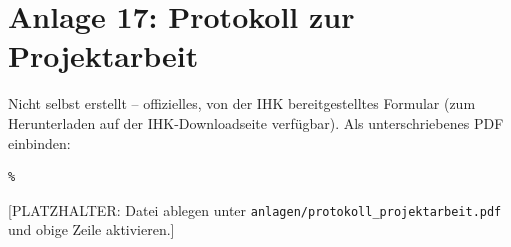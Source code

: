 \section*{Anlage 17: Protokoll zur Projektarbeit}
\label{anh:protokoll_projektarbeit}
Nicht selbst erstellt -- offizielles, von der IHK bereitgestelltes Formular
(zum Herunterladen auf der IHK-Downloadseite verf\"ugbar). Als
unterschriebenes PDF einbinden:
\begin{verbatim}
% 
\end{verbatim}
[PLATZHALTER: Datei ablegen unter \texttt{anlagen/protokoll\_projektarbeit.pdf}
und obige Zeile aktivieren.]
